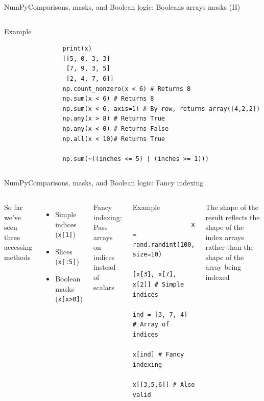 \documentclass[10pt,compress]{beamer} %
\begin{document}
\begin{frame}[fragile]{NumPy}{Comparisons, masks, and Boolean logic: Booleans arrays masks (II)}
	
	\begin{columns}
		\begin{exampleblock}{\footnotesize{Example}}
		\vspace{-0.2cm} 
			\begin{lstlisting}
				print(x)
				[[5, 0, 3, 3]
				 [7, 9, 3, 5]
				 [2, 4, 7, 6]]
				np.count_nonzero(x < 6) # Returns 8
				np.sum(x < 6) # Returns 8
				np.sum(x < 6, axis=1) # By row, returns array([4,2,2])
				np.any(x > 8) # Returns True
				np.any(x < 0) # Returns False
				np.all(x < 10)# Returns True

				np.sum(~((inches <= 5) | (inches >= 1)))
			\end{lstlisting}
		\vspace{-0.2cm} 
		\end{exampleblock}
	\end{columns}
\end{frame}

\begin{frame}[fragile]{NumPy}{Comparisons, masks, and Boolean logic: Fancy indexing}
	\begin{columns}
 	   \column{0.4\textwidth}
	So far we've seen three accessing methods
	\begin{itemize}
		\item Simple indices (\texttt{x[1]})
		\item Slices (\texttt{x[:5]})
		\item Boolean masks (\texttt{x[x>0]})
	\end{itemize}
	Fancy indexing: Pass arrays on indices instead of scalars
 	   \column{0.6\textwidth}
		\begin{exampleblock}{\footnotesize{Example}}
		\vspace{-0.2cm} 
			\begin{lstlisting}
				x = rand.randint(100, size=10)
				[x[3], x[7], x[2]] # Simple indices
				ind = [3, 7, 4] # Array of indices
				x[ind] # Fancy indexing
				x[[3,5,6]] # Also valid
			\end{lstlisting}
		\vspace{-0.2cm} 
		\end{exampleblock}

		\footnotesize{
		\begin{alertblock}{}
		The shape of the result reflects the shape of the index arrays rather than the shape of the array being indexed
		\end{alertblock}
		}
	\end{columns}
\end{frame}
\end{document}
